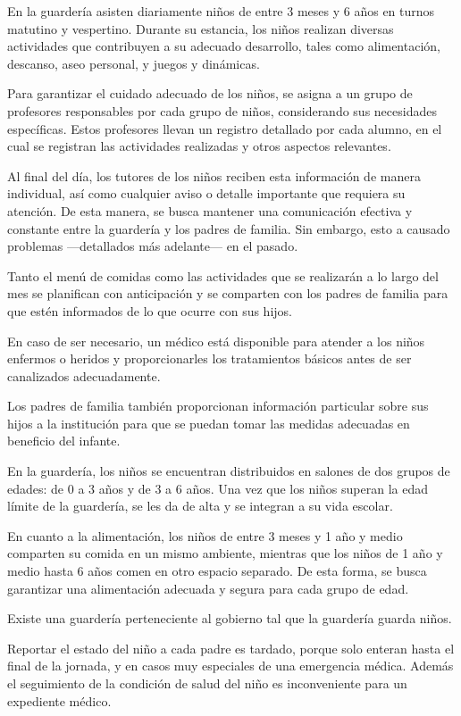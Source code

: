 \documentclass{article}
\begin{document}
En la guardería asisten diariamente niños de entre 3 meses y 6 años en turnos matutino y vespertino. Durante su estancia, los niños realizan diversas actividades que contribuyen a su adecuado desarrollo, tales como alimentación, descanso, aseo personal, y juegos y dinámicas.

Para garantizar el cuidado adecuado de los niños, se asigna a un grupo de profesores responsables por cada grupo de niños, considerando sus necesidades específicas. Estos profesores llevan un registro detallado por cada alumno, en el cual se registran las actividades realizadas y otros aspectos relevantes.

Al final del día, los tutores de los niños reciben esta información de manera individual, así como cualquier aviso o detalle importante que requiera su atención. De esta manera, se busca mantener una comunicación efectiva y constante entre la guardería y los padres de familia. Sin embargo, esto a causado problemas ---detallados más adelante--- en el pasado.

Tanto el menú de comidas como las actividades que se realizarán a lo largo del mes se planifican con anticipación y se comparten con los padres de familia para que estén informados de lo que ocurre con sus hijos.

En caso de ser necesario, un médico está disponible para atender a los niños enfermos o heridos y proporcionarles los tratamientos básicos antes de ser canalizados adecuadamente.

Los padres de familia también proporcionan información particular sobre sus hijos a la institución para que se puedan tomar las medidas adecuadas en beneficio del infante.

En la guardería, los niños se encuentran distribuidos en salones de dos grupos de edades: de 0 a 3 años y de 3 a 6 años. Una vez que los niños superan la edad límite de la guardería, se les da de alta y se integran a su vida escolar.

En cuanto a la alimentación, los niños de entre 3 meses y 1 año y medio comparten su comida en un mismo ambiente, mientras que los niños de 1 año y medio hasta 6 años comen en otro espacio separado. De esta forma, se busca garantizar una alimentación adecuada y segura para cada grupo de edad.

Existe una guardería perteneciente al gobierno tal que la guardería guarda niños.

Reportar el estado del niño a cada padre es tardado, porque solo enteran hasta el final de la jornada, y en casos muy especiales de una emergencia médica. Además el seguimiento de la condición de salud del niño es inconveniente para un expediente médico.
\end{document}
